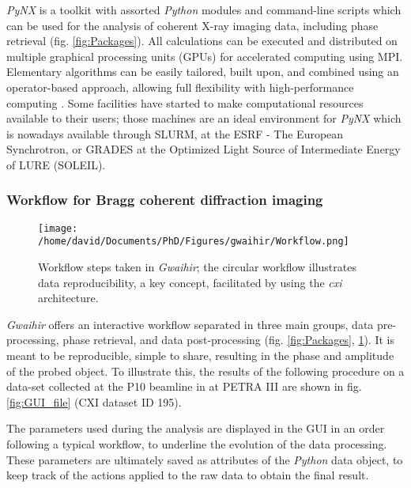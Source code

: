 \textit{PyNX} \parencite{pynx2011} is a toolkit with assorted \textit{Python} modules and command-line scripts which can be used for the analysis of coherent X-ray imaging data, including phase retrieval (fig. \ref{fig:Packages}).
All calculations can be executed and distributed on multiple graphical processing units (GPUs) for accelerated computing using MPI.
Elementary algorithms can be easily tailored, built upon, and combined using an operator-based approach, allowing full flexibility with high-performance computing \parencite{pynx2020operators}.
Some facilities have started to make computational resources available to their users; those machines are an ideal environment for \textit{PyNX} which is nowadays available through SLURM, at the ESRF - The European Synchrotron, or GRADES at the Optimized Light Source of Intermediate Energy of LURE (SOLEIL).

\subsubsection{Workflow for Bragg coherent diffraction imaging} \label{sec:Workflow}

\begin{figure}[!htb]
    \centering
    \texttt{[image: /home/david/Documents/PhD/Figures/gwaihir/Workflow.png]}
    \caption{Workflow steps taken in \textit{Gwaihir}; the circular workflow illustrates data reproducibility, a key concept, facilitated by using the \textit{cxi} architecture.}
    \label{fig:Workflow}
\end{figure}

\textit{Gwaihir} offers an interactive workflow separated in three main groups, data pre-processing, phase retrieval, and data post-processing (fig. \ref{fig:Packages}, \ref{fig:Workflow}). It is meant to be reproducible, simple to share, resulting in the phase and amplitude of the probed object. To illustrate this, the results of the following procedure on a data-set collected at the P10 beamline in at PETRA III are shown in fig. \ref{fig:GUI_file} (CXI dataset ID 195).

The parameters used during the analysis are displayed in the GUI in an order following a typical workflow, to underline the evolution of the data processing.
These parameters are ultimately saved as attributes of the \textit{Python} data object, to keep track of the actions applied to the raw data to obtain the final result.

